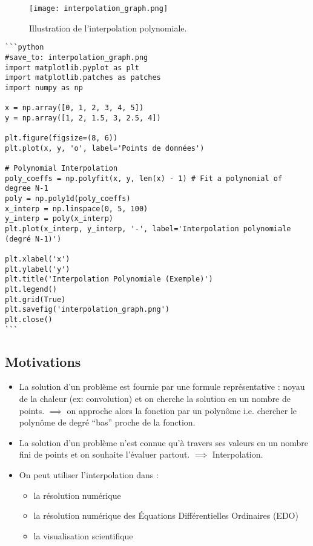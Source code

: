 \documentclass[oneside]{book}
\begin{document}
\begin{figure}[h]
    \centering
    \texttt{[image: interpolation\_graph.png]}
    \caption{Illustration de l'interpolation polynomiale.}
    \label{fig:interpolation_graph}
\end{figure}

\begin{verbatim}
```python
#save_to: interpolation_graph.png
import matplotlib.pyplot as plt
import matplotlib.patches as patches
import numpy as np

x = np.array([0, 1, 2, 3, 4, 5])
y = np.array([1, 2, 1.5, 3, 2.5, 4])

plt.figure(figsize=(8, 6))
plt.plot(x, y, 'o', label='Points de données')

# Polynomial Interpolation
poly_coeffs = np.polyfit(x, y, len(x) - 1) # Fit a polynomial of degree N-1
poly = np.poly1d(poly_coeffs)
x_interp = np.linspace(0, 5, 100)
y_interp = poly(x_interp)
plt.plot(x_interp, y_interp, '-', label='Interpolation polynomiale (degré N-1)')

plt.xlabel('x')
plt.ylabel('y')
plt.title('Interpolation Polynomiale (Exemple)')
plt.legend()
plt.grid(True)
plt.savefig('interpolation_graph.png')
plt.close()
```
\end{verbatim}


\subsection{Motivations}

\begin{itemize}
    \item La solution d'un problème est fournie par une formule représentative : noyau de la chaleur (ex: convolution) et on cherche la solution en un nombre de points.
    $\implies$ on approche alors la fonction par un polynôme i.e. chercher le polynôme de degré ``bas'' proche de la fonction.
    \item La solution d'un problème n'est connue qu'à travers ses valeurs en un nombre fini de points et on souhaite l'évaluer partout.
    $\implies$ Interpolation.
    \item On peut utiliser l'interpolation dans :
    \begin{itemize}
        \item la résolution numérique
        \item la résolution numérique des Équations Différentielles Ordinaires (EDO)
        \item la visualisation scientifique
    \end{itemize}
\end{itemize}
\end{document}
